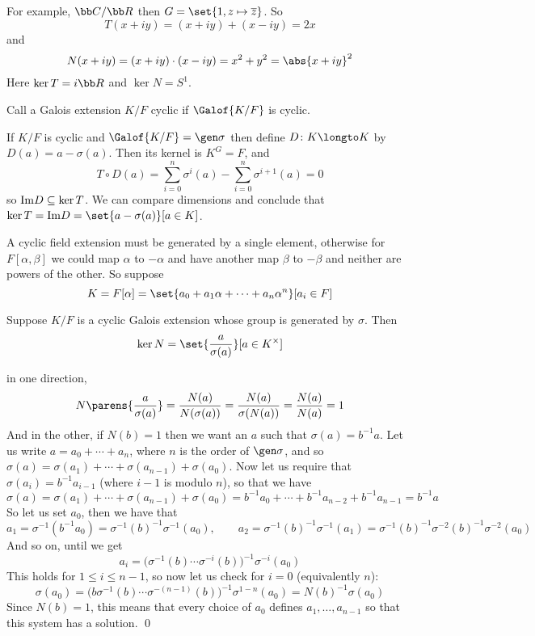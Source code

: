 For example, ${\bb C}/{\bb R}$ then $G=\set{1,z\mapsto\overline z}$.
So
$$ T(x+iy) = (x+iy) + (x-iy) = 2x $$
and
$$ N(x+iy) = (x + iy)\cdot(x-iy) = x^2 + y^2 = \abs{x+iy}^2 $$
Here $\ker T=i{\bb R}$ and $\ker N=S^1$.

\bdefn

    Call a Galois extension $K/F$ {\emphcolor cyclic} if $\Galof{K/F}$ is cyclic.

\edefn

If $K/F$ is cyclic and $\Galof{K/F}=\gen\sigma$ then define $D\colon K\longto K$ by $D(a)=a-\sigma(a)$.
Then its kernel is $K^G=F$, and
$$ T\circ D(a) = \sum_{i=0}^n\sigma^i(a) - \sum_{i=0}^n\sigma^{i+1}(a) = 0 $$
so ${\rm Im}D\subseteq\ker T$.
We can compare dimensions and conclude that $\ker T={\rm Im}D=\set{a-\sigma(a)}[a\in K]$.

A cyclic field extension must be generated by a single element, otherwise for $F[\alpha,\beta]$ we could map $\alpha$ to $-\alpha$ and have another map $\beta$ to $-\beta$ and neither are powers of the
other.
So suppose
$$ K = F[\alpha] = \set{a_0+a_1\alpha+\cdots+a_n\alpha^n}[a_i\in F] $$

\bthrm[title=Hilbert's Theorem 90, name=hilbert90]

    Suppose $K/F$ is a cyclic Galois extension whose group is generated by $\sigma$.
    Then
    $$ \ker N = \set{\frac a{\sigma(a)}}[a\in K^\times] $$

\ethrm

\Proof in one direction,
$$ N\parens{\frac a{\sigma(a)}} = \frac{N(a)}{N(\sigma(a))} = \frac{N(a)}{\sigma(N(a))} = \frac{N(a)}{N(a)} = 1 $$
And in the other, if $N(b)=1$ then we want an $a$ such that $\sigma(a)=b^{-1}a$.
Let us write $a = a_0 + \cdots + a_n$, where $n$ is the order of $\gen\sigma$, and so $\sigma(a)=\sigma(a_1)+\cdots+\sigma(a_{n-1})+\sigma(a_0)$.
Now let us require that $\sigma(a_i)=b^{-1}a_{i-1}$ (where $i-1$ is modulo $n$), so that we have
$$ \sigma(a) = \sigma(a_1) + \cdots + \sigma(a_{n-1}) + \sigma(a_0) = b^{-1}a_0 + \cdots + b^{-1}a_{n-2} + b^{-1}a_{n-1} = b^{-1}a $$
So let us set $a_0$, then we have that
$$ a_1=\sigma^{-1}(b^{-1}a_0)=\sigma^{-1}(b)^{-1}\sigma^{-1}(a_0),\qquad a_2=\sigma^{-1}(b)^{-1}\sigma^{-1}(a_1)=\sigma^{-1}(b)^{-1}\sigma^{-2}(b)^{-1}\sigma^{-2}(a_0)$$
And so on, until we get
$$ a_i = \bigl(\sigma^{-1}(b)\cdots\sigma^{-i}(b)\bigr)^{-1}\sigma^{-i}(a_0) $$
This holds for $1\leq i\leq n-1$, so now let us check for $i=0$ (equivalently $n$):
$$ \sigma(a_0) = \bigl(b\sigma^{-1}(b)\cdots\sigma^{-(n-1)}(b)\bigr)^{-1}\sigma^{1-n}(a_0) = N(b)^{-1}\sigma(a_0) $$
Since $N(b)=1$, this means that every choice of $a_0$ defines $a_1,\dots,a_{n-1}$ so that this system has a solution.
\qed

